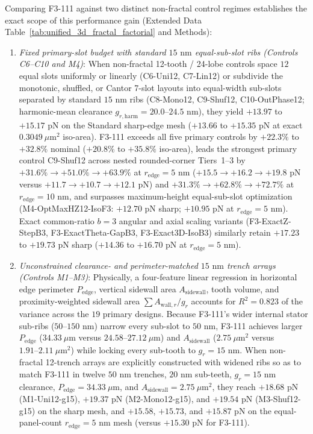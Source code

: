 \documentclass[11pt, a4paper]{article}
\begin{document}
Comparing F3-111 against two distinct non-fractal control regimes establishes the exact scope of this performance gain (Extended Data Table~\ref{tab:unified_3d_fractal_factorial} and Methods):
\begin{enumerate}
  \item \emph{Fixed primary-slot budget with standard $15\text{ nm}$ equal-sub-slot ribs (Controls C6--C10 and M4)}: When non-fractal 12-tooth / 24-lobe controls space $12$ equal slots uniformly or linearly (C6-Uni12, C7-Lin12) or subdivide the monotonic, shuffled, or Cantor 7-slot layouts into equal-width sub-slots separated by standard $15\text{ nm}$ ribs (C8-Mono12, C9-Shuf12, C10-OutPhase12; harmonic-mean clearance $g_{r,\mathrm{harm}} = 20.0\text{--}24.5\text{ nm}$), they yield $+13.97$ to $+15.17\text{ pN}$ on the Standard sharp-edge mesh ($+13.66$ to $+15.35\text{ pN}$ at exact $0.3049\ \mu\text{m}^2$ iso-area). F3-111 exceeds all five primary controls by $+22.3\%$ to $+32.8\%$ nominal ($+20.8\%$ to $+35.8\%$ iso-area), leads the strongest primary control C9-Shuf12 across nested rounded-corner Tiers~1--3 by $+31.6\% \to +51.0\% \to +63.9\%$ at $r_{\mathrm{edge}}=5\text{ nm}$ ($+15.5 \to +16.2 \to +19.8\text{ pN}$ versus $+11.7 \to +10.7 \to +12.1\text{ pN}$) and $+31.3\% \to +62.8\% \to +72.7\%$ at $r_{\mathrm{edge}}=10\text{ nm}$, and surpasses maximum-height equal-sub-slot optimization (M4-OptMaxHZ12-IsoF3: $+12.70\text{ pN}$ sharp; $+10.95\text{ pN}$ at $r_{\mathrm{edge}}=5\text{ nm}$). Exact common-ratio $b=3$ angular and axial scaling variants (F3-ExactZ-StepB3, F3-ExactTheta-GapB3, F3-Exact3D-IsoB3) similarly retain $+17.23$ to $+19.73\text{ pN}$ sharp ($+14.36$ to $+16.70\text{ pN}$ at $r_{\mathrm{edge}}=5\text{ nm}$).
  \item \emph{Unconstrained clearance- and perimeter-matched $15\text{ nm}$ trench arrays (Controls M1--M3)}: Physically, a four-feature linear regression in horizontal edge perimeter $P_{\mathrm{edge}}$, vertical sidewall area $A_{\mathrm{sidewall}}$, tooth volume, and proximity-weighted sidewall area $\sum A_{\mathrm{wall},r}/g_r$ accounts for $R^2 = 0.823$ of the variance across the $19$ primary designs. Because F3-111's wider internal stator sub-ribs ($50\text{--}150\text{ nm}$) narrow every sub-slot to $50\text{ nm}$, F3-111 achieves larger $P_{\mathrm{edge}}$ ($34.33\ \mu\text{m}$ versus $24.58\text{--}27.12\ \mu\text{m}$) and $A_{\mathrm{sidewall}}$ ($2.75\ \mu\text{m}^2$ versus $1.91\text{--}2.11\ \mu\text{m}^2$) while locking every sub-tooth to $g_r = 15\text{ nm}$. When non-fractal 12-trench arrays are explicitly constructed with widened ribs so as to match F3-111 in twelve $50\text{ nm}$ trenches, $20\text{ nm}$ sub-teeth, $g_r = 15\text{ nm}$ clearance, $P_{\mathrm{edge}} = 34.33\ \mu\text{m}$, and $A_{\mathrm{sidewall}} = 2.75\ \mu\text{m}^2$, they reach $+18.68\text{ pN}$ (M1-Uni12-g15), $+19.37\text{ pN}$ (M2-Mono12-g15), and $+19.54\text{ pN}$ (M3-Shuf12-g15) on the sharp mesh, and $+15.58$, $+15.73$, and $+15.87\text{ pN}$ on the equal-panel-count $r_{\mathrm{edge}}=5\text{ nm}$ mesh (versus $+15.30\text{ pN}$ for F3-111).
\end{enumerate}
\end{document}
